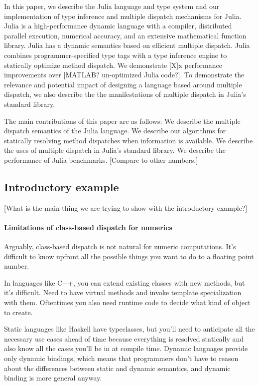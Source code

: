 In this paper, we describe the Julia language and type system and our implementation of type inference and multiple dispatch mechanisms for Julia. Julia is a high-performance dynamic language with a compiler, distributed parallel execution, numerical accuracy, and an extensive mathematical function library. Julia has a dynamic semantics based on efficient multiple dispatch. Julia combines programmer-specified type tags with a type inference engine to statically optimize method dispatch. We demonstrate [X]x performance improvements over [MATLAB? un-optimized Julia code?]. To demonstrate the relevance and potential impact of designing a language based around multiple dispatch, we also describe the the manifestations of multiple dispatch in Julia's standard library.

The main contributions of this paper are as follows:
We describe the multiple dispatch semantics of the Julia language.
We describe our algorithms for statically resolving method dispatches when information is available.
We describe the uses of multiple dispatch in Julia’s standard library.
We describe the performance of Julia benchmarks. [Compare to other numbers.]

\subsection{Introductory example}
[What is the main thing we are trying to show with the introductory example?]

\paragraph{Limitations of class-based dispatch for numerics} %

Arguably, class-based dispatch is not natural for numeric computations. It's difficult to know upfront all the possible things you want to do to a floating point number.

In languages like C++, you can extend existing classes with new methods, but it's difficult. Need to have virtual methods and invoke template specialization with them. Oftentimes you also need runtime code to decide what kind of object to create.

Static languages like Haskell have typeclasses\cite{typeclass}, but you'll need to anticipate all the necessary use cases ahead of time because everything is resolved statically and also know all the cases you'll be in at compile time. Dynamic languages provide only dynamic bindings,  which means that programmers don't have to reason about the differences between static and dynamic semantics, and dynamic binding is more general anyway.

